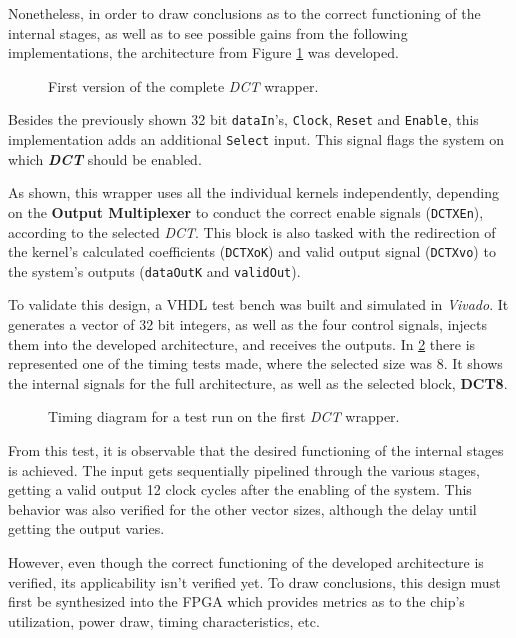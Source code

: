 Nonetheless, in order to draw conclusions as to the correct functioning of the internal stages, as well as to see possible gains from the following implementations, the architecture from Figure \ref{fig:fullv1} was developed.

\begin{figure}[!htbp]
    \centering
    
    \caption{First version of the complete \emph{DCT} wrapper.}
    \label{fig:fullv1}
\end{figure}

Besides the previously shown 32 bit \texttt{dataIn}'s, \texttt{Clock}, \texttt{Reset} and \texttt{Enable}, this implementation adds an additional \texttt{Select} input. This signal flags the system on which \emph{\textbf{DCT}} should be enabled.

As shown, this wrapper uses all the individual kernels independently, depending on the \textbf{Output Multiplexer} to conduct the correct enable signals (\texttt{DCTXEn}), according to the selected \emph{DCT}. This block is also tasked with the redirection of the kernel's calculated coefficients (\texttt{DCTXoK}) and valid output signal (\texttt{DCTXvo}) to the system's outputs (\texttt{dataOutK} and \texttt{validOut}).

To validate this design, a VHDL test bench was built and simulated in \emph{Vivado}. It generates a vector of 32 bit integers, as well as the four control signals, injects them into the developed architecture, and receives the outputs. In \ref{fig:v1timing} there is represented one of the timing tests made, where the selected size was 8. It shows the internal signals for the full architecture, as well as the selected block, \textbf{DCT8}.

\begin{figure}[!htbp]
    \centering
    
    \caption{Timing diagram for a test run on the first \emph{DCT} wrapper.}
    \label{fig:v1timing}
\end{figure}

From this test, it is observable that the desired functioning of the internal stages is achieved. The input gets sequentially pipelined through the various stages, getting a valid output 12 clock cycles after the enabling of the system. This behavior was also verified for the other vector sizes, although the delay until getting the output varies.

However, even though the correct functioning of the developed architecture is verified, its applicability isn't verified yet. To draw conclusions, this design must first be synthesized into the FPGA which provides metrics as to the chip's utilization, power draw, timing characteristics, etc.

